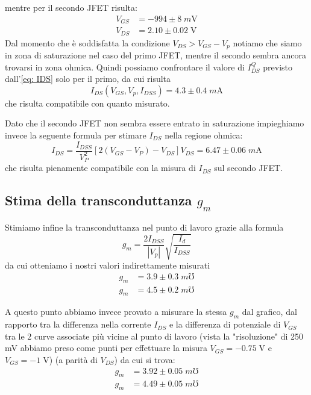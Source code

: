 \documentclass[10pt, a4paper, italian]{article}
\begin{document}
mentre per il secondo JFET risulta:
\begin{align*}
V_{GS} &= -994 \pm 8 \; \si{m\V} \\
V_{DS} &= 2.10 \pm 0.02 \; \si{\V}
\end{align*}
Dal momento che è soddisfatta la condizione $V_{DS} > V_{GS} - V_p$ notiamo che
siamo in zona di saturazione nel caso del primo JFET, mentre il secondo sembra
ancora trovarsi in zona ohmica. Quindi possiamo confrontare il valore di
$I_{DS}^Q$ previsto dall'\cref{eq: IDS} solo per il primo, da cui risulta 
\[
I_{DS}(V_{GS},V_p,I_{DSS}) = 4.3 \pm 0.4 \; \si{m\A}
\]
che risulta compatibile con quanto misurato.

Dato che il secondo JFET non sembra essere entrato in saturazione impieghiamo
invece la seguente formula per stimare $I_{DS}$ nella regione ohmica:
\begin{equation}
I_{DS} = \frac{I_{DSS}}{V_P^2}[2(V_{GS}-V_P) - V_{DS}]V_{DS} =
6.47 \pm 0.06 \; \si{m\A}
\end{equation}
che risulta pienamente compatibile con la misura di $I_{DS}$ sul secondo JFET.

\subsection{Stima della transconduttanza $g_m$}
Stimiamo infine la transconduttanza nel punto di lavoro grazie alla formula
\begin{equation}\label{eq: gm}
g_m = \frac{2 I_{DSS}}{|V_p|}\sqrt{\frac{I_{d}}{I_{DSS}}}
\end{equation}
da cui otteniamo i nostri valori indirettamente misurati
\begin{align*}
g_m &= 3.9 \pm 0.3 \; \si{m\mho} \\
g_m &= 4.5 \pm 0.2 \; \si{m\mho}
\end{align*}

A questo punto abbiamo invece provato a misurare la stessa $g_m$ dal grafico,
dal rapporto tra la differenza nella corrente $I_{DS} $ e la differenza di
potenziale di $V_{GS}$ tra le 2 curve associate più vicine al punto di lavoro
(vista la "risoluzione" di 250 mV abbiamo preso come punti per effettuare la
misura $V_{GS}= -0.75 \; \si{\V}$ e $V_{GS}= -1 \; \si{\V}$)
(a parità di $V_{DS}$) da cui si trova:
\begin{align*}
g_m &= 3.92 \pm 0.05 \; \si{m\mho} \\
g_m &= 4.49 \pm 0.05 \; \si{m\mho}
\end{align*}
\end{document}
